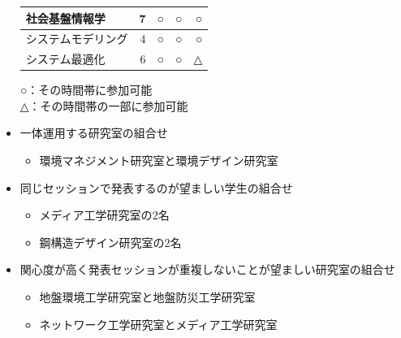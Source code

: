\documentclass[a4paper,12pt,fleqn]{jarticle}
\begin{document}
\begin{itemize}
\begin{table}[H]
\begin{center}
\begin{tabular}{lrrrr}
        社会基盤情報学 & 7 & ○ & ○ & ○\\ \hline
        システムモデリング & 4 & ○ & ○ & ○\\ \hline
        システム最適化 & 6  & ○ & ○ & △\\ \bottomrule
      \end{tabular}
    \end{center}
    \hspace{1cm} ○：その時間帯に参加可能 \\
    \hspace{1cm} △：その時間帯の一部に参加可能
  \end{table}
\item 一体運用する研究室の組合せ
\begin{itemize}
\item 環境マネジメント研究室と環境デザイン研究室
\end{itemize}
\item 同じセッションで発表するのが望ましい学生の組合せ
\begin{itemize}
\item メディア工学研究室の$2$名
\item 鋼構造デザイン研究室の$2$名
\end{itemize}
\item 関心度が高く発表セッションが重複しないことが望ましい研究室の組合せ
\begin{itemize}
\item 地盤環境工学研究室と地盤防災工学研究室
\item ネットワーク工学研究室とメディア工学研究室
\end{itemize}
\end{itemize}
\end{document}
